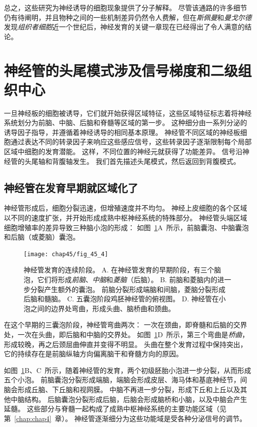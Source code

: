 总之，这些研究为神经诱导的细胞现象提供了分子解释。
尽管该通路的许多细节仍有待阐明，并且物种之间的一些机制差异仍然令人费解，但在\textit{斯佩曼}和\textit{曼戈尔德}发现\textit{组织者细胞}近一个世纪后，神经发育的关键一章现在已经得出了令人满意的结论。



\section{神经管的头尾模式涉及信号梯度和二级组织中心}

一旦神经板的细胞被诱导，它们就开始获得区域特征，这些区域特征标志着将神经系统划分为前脑、中脑、后脑和脊髓等区域的第一步。
这种细分由一系列分泌的诱导因子指导，并遵循着神经诱导的相同基本原理。
神经管不同区域的神经板细胞通过表达不同的转录因子来响应这些感应信号，这些转录因子逐渐限制每个局部区域中细胞的发育潜能。
这样，不同位置的神经元就获得了功能差异。
信号沿神经管的头尾轴和背腹轴发生。
我们首先描述头尾模式，然后返回到背腹模式。



\subsection{神经管在发育早期就区域化了}

神经管形成后，细胞分裂迅速，但增殖速度并不均匀。
神经上皮细胞的各个区域以不同的速度扩张，并开始形成成熟中枢神经系统的特殊部分。
神经管头端区域细胞增殖率的差异导致三种脑小泡的形成：
如图~\ref{fig:45_4}A~所示，前脑囊泡、中脑囊泡和后脑（或菱脑）囊泡。


\begin{figure}[htbp]
	\centering
	\texttt{[image: chap45/fig\_45\_4]}
	\caption{神经管发育的连续阶段。
		A. 在神经管发育的早期阶段，有三个脑泡，它们将形成\textit{前脑}、\textit{中脑}和\textit{菱脑}（后脑）。
		B. 前脑和菱脑内的进一步分裂产生额外的囊泡。
		前脑分裂形成端脑和间脑，菱脑分裂形成后脑和髓脑。
		C. 五囊泡阶段鸡胚神经管的俯视图。
		D. 神经管在小泡之间的边界处弯曲，形成头曲、脑桥曲和颈曲。}
	\label{fig:45_4}
\end{figure}


在这个早期的三囊泡阶段，神经管弯曲两次：
一次在颈曲，即脊髓和后脑的交界处，一次在头曲，即后脑和中脑的交界处。
如图~\ref{fig:45_4}D~所示，第三个弯曲是\textit{桥曲}，形成较晚，再之后颈屈曲伸直并变得不明显。
头曲在整个发育过程中保持突出，它的持续存在是前脑纵轴方向偏离脑干和脊髓方向的原因。


如图~\ref{fig:45_4}B、C~所示，随着神经管的发育，两个初级胚胎小泡进一步分裂，从而形成五个小泡。
前脑囊泡分裂形成端脑，端脑会形成皮层、海马体和基底神经节，间脑会形成丘脑、下丘脑和视网膜。
中脑不再进一步分裂，形成下丘和上丘以及其他中脑结构。
后脑囊泡分裂形成后脑，后脑会形成脑桥和小脑，以及中脑会产生延髓。
这些部分与脊髓一起构成了成熟中枢神经系统的主要功能区域（见第~\ref{chap:chap4}~章）。
神经管逐渐细分为这些功能域是受各种分泌信号的调节。




